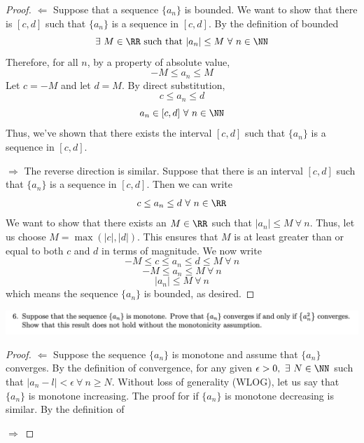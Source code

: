 \documentclass[12pt]{scrartcl}
\begin{document}
\begin{proof}
  
\hfill

$\Longleftarrow$ Suppose that a sequence $\{a_n\}$ is bounded. We want to show that 
there is $[c, d]$ such that $\{a_n\}$ is a sequence in $[c, d]$. By the definition of bounded
\[\exists \ M \in \RR \text{ such that } |a_n| \leq M \ \forall \ n \in \NN\]
Therefore, for all $n$, by a property of absolute value,
\[-M \leq a_n \leq M\]
Let $c = -M$ and let $d = M$. By direct substitution, 
\[c \leq a_n \leq d\]
\[a_n \in [c, d] \ \forall \ n \in \NN\]
Thus, we've shown that there exists the interval $[c,d]$ such that $\{a_n\}$ is a sequence in $[c, d]$. 
\hfill

$\Longrightarrow$ The reverse direction is similar. Suppose that there is an interval 
$[c, d]$ such that $\{a_n\}$ is a sequence in $[c,d]$. Then we can write 
\[c \leq a_n \leq d \ \forall \ n \in \RR\]
We want to show that there exists an $M \in \RR$ such that $|a_n| \leq M \ \forall \ n$. 
Thus, let us choose $M = \max(|c|, |d|)$. This ensures that $M$ is at least greater than or equal to both 
$c$ and $d$ in terms of magnitude. We now write 
\[-M \leq c \leq a_n \leq d \leq M \ \forall \ n\]
\[-M \leq a_n \leq M \ \forall \ n\]
\[|a_n| \leq M \ \forall \ n\]
which means the sequence $\{a_n\}$ is bounded, as desired.
\end{proof}

\newpage

\includegraphics[width=15cm]{6.png}

\begin{proof}

\hfill

$\Longleftarrow$ Suppose the sequence $\{a_n\}$ is monotone and assume that $\{a_n\}$ converges. By
the definition of convergence, for any given $\epsilon > 0, \ \exists \ N \in \NN$ such that 
$|a_n - l| < \epsilon \ \forall \ n \geq N$. Without loss of generality (WLOG), let us say that 
$\{a_n\}$ is monotone increasing. The proof for if $\{a_n\}$ is monotone decreasing is similar. 
By the definition of 

\hfill

$\Longrightarrow$ 
  
\end{proof}
\end{document}
